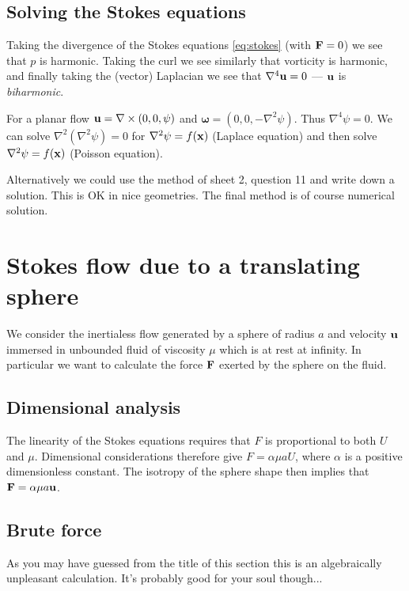 \documentclass{notes}
\newcommand{\om}{\boldsymbol{\omega}}
\theoremstyle{plain}
\begin{document}
\subsection{Solving the Stokes equations}

Taking the divergence of the Stokes equations \eqref{eq:stokes}
(with $\mathbf{F} = 0$) we see that $p$ is harmonic.  Taking the
curl we see similarly that vorticity is harmonic, and finally taking
the (vector) Laplacian we see that $\nabla^4 \mathbf{u} = 0$ ---
$\mathbf{u}$ is \emph{biharmonic}.

For a planar flow $\mathbf{u} = \nabla \times (0,0,\psi)$ and 
$\om = (0,0,-\nabla^2 \psi)$.  Thus $\nabla^4 \psi = 0$.  We
can solve $\nabla^2 \left( \nabla^2 \psi \right) = 0$ for $\nabla^2 \psi
= f(\mathbf{x})$
(Laplace equation) and then solve $\nabla^2 \psi = f(\mathbf{x})$ (Poisson
equation).

Alternatively we could use the method of sheet 2, question 11 and write
down a solution.  This is OK in nice geometries.  The final method is
of course numerical solution.

\section{Stokes flow due to a translating sphere}

We consider the inertialess flow generated by a sphere of radius
$a$ and velocity $\mathbf{u}$ immersed in unbounded fluid of
viscosity $\mu$ which is at rest at infinity.  In particular we want
to calculate the force $\mathbf{F}$ exerted by the sphere on the fluid.

\subsection{Dimensional analysis}

The linearity of the Stokes equations requires that $F$ is proportional
to both $U$ and $\mu$.  Dimensional considerations therefore give
$F = \alpha \mu a U$, where $\alpha$ is a positive dimensionless constant.
The isotropy of the sphere shape then implies that
$\mathbf{F} = \alpha \mu a \mathbf{u}$.

\subsection{Brute force}\label{ref:sphereflow}

As you may have guessed from the title of this section this is an
algebraically unpleasant calculation.  It's probably good for your
soul though...
\end{document}

